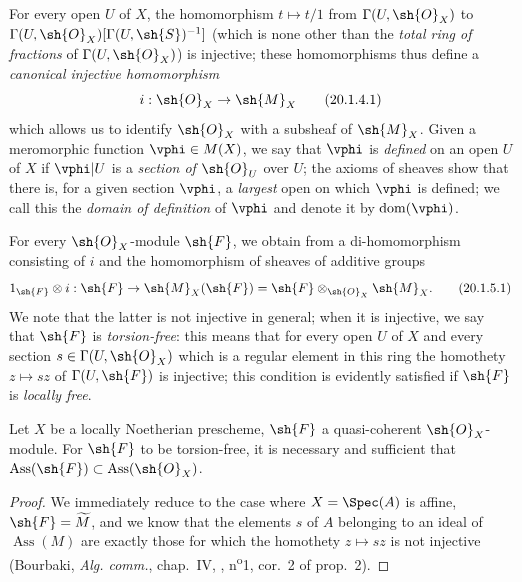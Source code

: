 \begin{env}[20.1.4]
\label{IV.20.1.4}
For every open $U$ of $X$, the homomorphism $t\mapsto t/1$ from $\Gamma(U,\sh{O}_X)$ to $\Gamma(U,\sh{O}_X)[\Gamma(U,\sh{S})^{-1}]$ (which is none other than the \emph{total ring of fractions} of
$\Gamma(U,\sh{O}_X)$) is injective;
these homomorphisms thus define a \emph{canonical injective homomorphism}
\[
\label{IV.20.1.4.1}
  i:\sh{O}_X\to\sh{M}_X
  \tag{20.1.4.1}
\]
which allows us to identify $\sh{O}_X$ with a subsheaf of $\sh{M}_X$.
Given a meromorphic function $\vphi\in M(X)$, we say that $\vphi$ is \emph{defined} on an open $U$ of $X$ if $\vphi|U$ is a \emph{section of $\sh{O}_U$} over $U$;
the axioms of sheaves show that there is, for a given section $\vphi$, a \emph{largest} open on which $\vphi$ is defined;
we call this the \emph{domain of definition} of $\vphi$ and denote it by $\operatorname{dom}(\vphi)$.
\end{env}

\begin{env}[20.1.5]
\label{IV.20.1.5}
For every $\sh{O}_X$-module $\sh{F}$, we obtain from  a di-homomorphism consisting of $i$ and the homomorphism of sheaves of additive groups
\[
\label{IV.20.1.5.1}
  1_\sh{F}\otimes i:\sh{F}\to\sh{M}_X(\sh{F})=\sh{F}\otimes_{\sh{O}_X}\sh{M}_X.
  \tag{20.1.5.1}
\]
We note that the latter is not injective in general;
when it is injective, we say that $\sh{F}$ is \emph{torsion-free}:
this means that for every open $U$ of $X$ and every section $s\in\Gamma(U,\sh{O}_X)$ which is a regular element in this ring the homothety $z\mapsto sz$ of $\Gamma(U,\sh{F})$ is injective;
this condition is evidently satisfied if $\sh{F}$ is \emph{locally free}.
\end{env}

\begin{proposition}[20.1.6]
\label{IV.20.1.6}
Let $X$ be a locally Noetherian prescheme, $\sh{F}$ a quasi-coherent $\sh{O}_X$-module.
For $\sh{F}$ to be torsion-free, it is necessary and sufficient that $\operatorname{Ass}(\sh{F})\subset\operatorname{Ass}(\sh{O}_X)$.
\end{proposition}
 
\begin{proof}
We immediately reduce to the case where $X=\Spec(A)$ is affine, $\sh{F}=\widetilde{M}$, and we know that the elements $s$ of $A$ belonging to an ideal of $\operatorname{Ass}(M)$ are exactly those for which the homothety $z\mapsto sz$ is not injective (Bourbaki, \emph{Alg. comm.}, chap.~IV, , n\textsuperscript{o}1, cor.~2 of prop.~2).
\end{proof}

